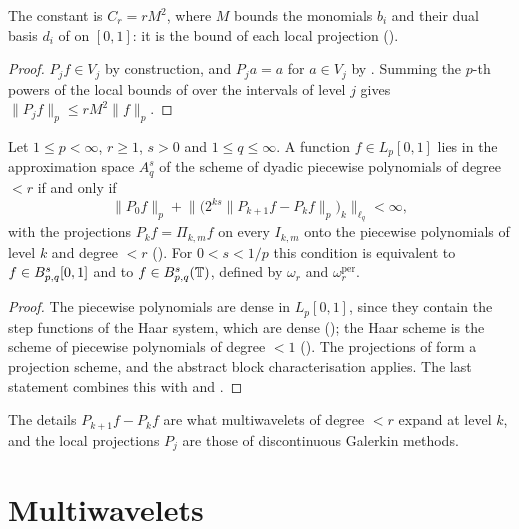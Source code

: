 The constant is $C_r = r M^2$, where $M$ bounds the monomials $b_i$ and their dual basis $d_i$ of
 on $[0, 1]$: it is the bound of each local projection
().

\begin{proof}
\leanok
$P_j f \in V_j$ by construction, and $P_j a = a$ for $a \in V_j$ by . Summing
the $p$-th powers of the local bounds of  over the intervals of level $j$
gives $\|P_j f\|_p \leq r M^2 \|f\|_p$.
\end{proof}

\begin{theorem}
\label{thm:pp-multiscale}
\leanok
{}
Let $1 \leq p < \infty$, $r \geq 1$, $s > 0$ and $1 \leq q \leq \infty$. A function
$f \in L_p[0,1]$ lies in the approximation space $A^s_q$ of the scheme of dyadic piecewise
polynomials of degree $< r$ if and only if
\[
  \|P_0 f\|_p + \bigl\| \bigl( 2^{ks} \|P_{k+1} f - P_k f\|_p \bigr)_k \bigr\|_{\ell_q} < \infty ,
\]
with the projections $P_k f = \Pi_{k,m} f$ on every $I_{k,m}$ onto the piecewise polynomials of
level $k$ and degree $< r$ (). For $0 < s < 1/p$ this condition is equivalent to
$f \in B^{s}_{p,q}[0,1]$ and to
$f \in B^{s}_{p,q}(\mathbb{T})$, defined by $\omega_r$ and $\omega_r^{\mathrm{per}}$.
\end{theorem}

\begin{proof}
\leanok
The piecewise polynomials are dense in $L_p[0,1]$, since they contain the step functions of
the Haar system, which are dense (); the Haar scheme is the scheme of
piecewise polynomials of degree $< 1$ (). The
projections of  form a projection scheme, and the abstract block
characterisation applies. The last statement combines this with  and
.
\end{proof}

The details $P_{k+1} f - P_k f$ are what multiwavelets of degree $< r$ expand at level $k$, and
the local projections $P_j$ are those of discontinuous Galerkin methods.

\section{Multiwavelets}
\label{sec:multiwavelets}

